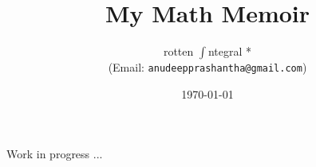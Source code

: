 \documentclass[a4paper, 11pt]{bookscr}
\title{\textbf{My Math Memoir}}
\author{rotten $\int$ntegral *\\(Email: \texttt{anudeepprashantha@gmail.com})}
\date{\today}
\begin{document}
\maketitle
    \tableofcontents
	Work in progress ...
\end{document}
